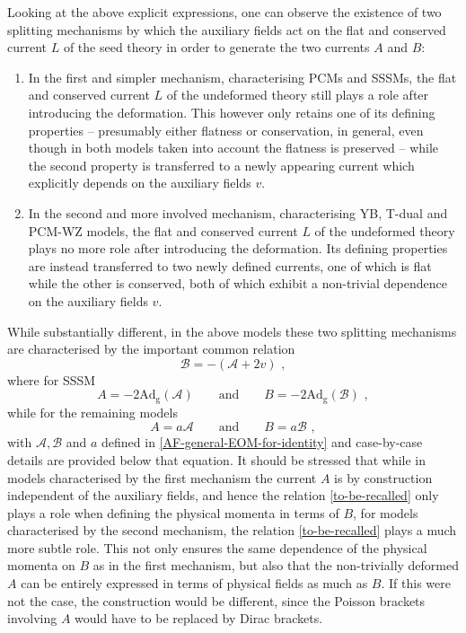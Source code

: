 \documentclass[12pt]{article}
\numberwithin{equation}{section}
\begin{document}
Looking at the above explicit expressions, one can observe the existence of two splitting mechanisms by which the auxiliary fields act on the flat and conserved current $L$ of the seed theory in order to generate the two currents $A$ and $B$:
\begin{enumerate}
\item In the first and simpler mechanism, characterising PCMs and SSSMs, the flat and conserved current $L$ of the undeformed theory still plays a role after introducing the deformation. This however only retains one of its defining properties -- presumably either flatness or conservation, in general, even though in both models taken into account the flatness is preserved -- while the second property is transferred to a newly appearing current which explicitly depends on the auxiliary fields $v$.
\item In the second and more involved mechanism, characterising YB, T-dual and PCM-WZ models, the flat and conserved current $L$ of the undeformed theory plays no more role after introducing the deformation. Its defining properties are instead transferred to two newly defined currents, one of which is flat while the other is conserved, both of which exhibit a non-trivial dependence on the auxiliary fields $v$. 
\end{enumerate} 
While substantially different, in the above models these two splitting mechanisms are characterised by the important common relation
\begin{equation}\label{to-be-recalled}
\mathcal{B}=-(\mathcal{A}+2v) \,\, ,
\end{equation}
where for SSSM
\begin{equation}
A=-2\mathrm{Ad}_{\mathrm{g}}(\mathcal{A})
\qquad \text{and} \qquad 
B=-2\mathrm{Ad}_{\mathrm{g}}(\mathcal{B}) \,\, ,
\end{equation}
while for the remaining models
\begin{equation}
A=a\mathcal{A}
\qquad \text{and} \qquad B=a\mathcal{B} \,\, ,
\end{equation}
with $\mathcal{A},\mathcal{B}$ and $a$ defined in \eqref{AF-general-EOM-for-identity} and case-by-case details are provided below that equation. It should be stressed that while in models characterised by the first mechanism the current $A$ is by construction independent of the auxiliary fields, and hence the relation \eqref{to-be-recalled} only plays a role when defining the physical momenta in terms of $B$, for models characterised by the second mechanism, the relation \eqref{to-be-recalled} plays a much more subtle role. This not only ensures the same dependence of the physical momenta on $B$ as in the first mechanism, but also that the non-trivially deformed $A$ can be entirely expressed in terms of physical fields as much as $B$. If this were not the case, the construction would be different, since the Poisson brackets involving $A$ would have to be replaced by Dirac brackets.
\end{document}
